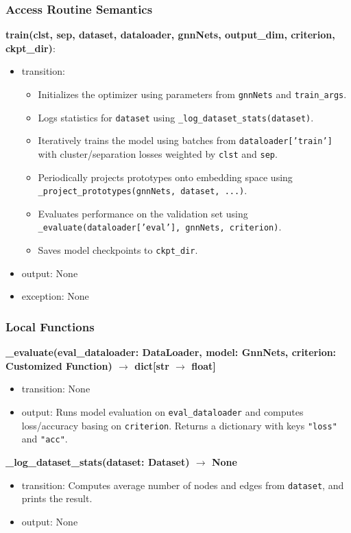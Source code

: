 \documentclass[12pt, titlepage]{article}
\begin{document}
\subsubsection{Access Routine Semantics}

\noindent \textbf{train(clst, sep, dataset, dataloader, gnnNets, output\_dim, criterion, ckpt\_dir)}:
\begin{itemize}
  \item transition:
  \begin{itemize}
    \item Initializes the optimizer using parameters from \texttt{gnnNets} and \texttt{train\_args}.
    \item Logs statistics for \texttt{dataset} using \texttt{\_log\_dataset\_stats(dataset)}.
    \item Iteratively trains the model using batches from \texttt{dataloader['train']} with cluster/separation losses weighted by \texttt{clst} and \texttt{sep}.
    \item Periodically projects prototypes onto embedding space using \texttt{\_project\_prototypes(gnnNets, dataset, ...)}.
    \item Evaluates performance on the validation set using \texttt{\_evaluate(dataloader['eval'], gnnNets, criterion)}.
    \item Saves model checkpoints to \texttt{ckpt\_dir}.
  \end{itemize}
  \item output: None
  \item exception: None
\end{itemize}

\subsubsection{Local Functions}

\noindent \textbf{\_evaluate(eval\_dataloader: DataLoader, model: GnnNets, criterion: Customized Function) \(\rightarrow\) dict[str $\rightarrow$ float]}
\begin{itemize}
  \item transition: None
  \item output: Runs model evaluation on \texttt{eval\_dataloader} and computes loss/accuracy basing on \texttt{criterion}. Returns a dictionary with keys \texttt{"loss"} and \texttt{"acc"}.
\end{itemize}

\noindent \textbf{\_log\_dataset\_stats(dataset: Dataset) \(\rightarrow\) None}
\begin{itemize}
  \item transition: Computes average number of nodes and edges from \texttt{dataset}, and prints the result.
  \item output: None
\end{itemize}
\end{document}
